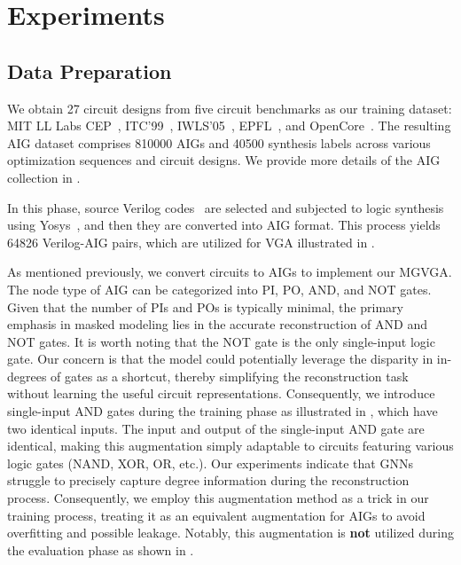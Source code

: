 \section{Experiments}
\label{sec:exp}

\subsection{Data Preparation}
\label{sec:aig_collect}

We obtain 27 circuit designs from five circuit benchmarks as our training dataset: MIT LL Labs CEP~\citep{brendon2019cep}, ITC'99~\citep{ITC99}, IWLS'05~\citep{albrecht2005iwls}, EPFL~\citep{EPFLBenchmarks2015}, and OpenCore~\citep{takeda2008opencore}. 
The resulting AIG dataset comprises 810000 AIGs and 40500 synthesis labels across various optimization sequences and circuit designs.
We provide more details of the AIG collection in .

In this phase, source Verilog codes~\citep{thakur2023benchmarking, liu2023rtlcoder} are selected and subjected to logic synthesis using Yosys~\citep{wolf2016yosys}, and then they are converted into AIG format.
This process yields 64826 Verilog-AIG pairs, which are utilized for VGA illustrated in .

As mentioned previously, we convert circuits to AIGs to implement our MGVGA. 
The node type of AIG can be categorized into PI, PO, AND, and NOT gates.
Given that the number of PIs and POs is typically minimal, the primary emphasis in masked modeling lies in the accurate reconstruction of AND and NOT gates. 
It is worth noting that the NOT gate is the only single-input logic gate.
Our concern is that the model could potentially leverage the disparity in in-degrees of gates as a shortcut, thereby simplifying the reconstruction task without learning the useful circuit representations. 
Consequently, we introduce single-input AND gates during the training phase as illustrated in , which have two identical inputs. 
The input and output of the single-input AND gate are identical, making this augmentation simply adaptable to circuits featuring various logic gates (NAND, XOR, OR, etc.).
Our experiments indicate that GNNs struggle to precisely capture degree information during the reconstruction process. 
Consequently, we employ this augmentation method as a trick in our training process, treating it as an equivalent augmentation for AIGs to avoid overfitting and possible leakage. 
Notably, this augmentation is \textbf{not} utilized during the evaluation phase as shown in .

